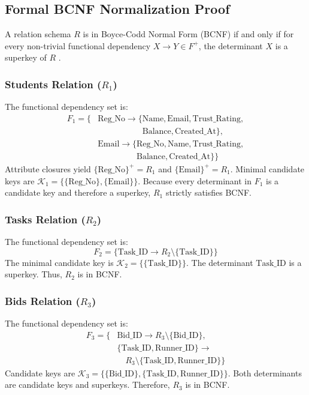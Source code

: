\documentclass[conference]{IEEEtran}
\begin{document}
\subsection{Formal BCNF Normalization Proof}
A relation schema $R$ is in Boyce-Codd Normal Form (BCNF) if and only if for every non-trivial functional dependency $X \to Y \in F^+$, the determinant $X$ is a superkey of $R$ \cite{codd1974further}.

\subsubsection{Students Relation ($R_1$)}
The functional dependency set is:
\begin{align*}
    F_1 = \{ & \text{Reg\_No} \to \{\text{Name}, \text{Email}, \text{Trust\_Rating}, \\
             & \phantom{\text{Reg\_No} \to \{} \text{Balance}, \text{Created\_At}\}, \\
             & \text{Email} \to \{\text{Reg\_No}, \text{Name}, \text{Trust\_Rating}, \\
             & \phantom{\text{Email} \to \{} \text{Balance}, \text{Created\_At}\} \}
\end{align*}
Attribute closures yield $\{\text{Reg\_No}\}^+ = R_1$ and $\{\text{Email}\}^+ = R_1$. Minimal candidate keys are $\mathcal{K}_1 = \{\{\text{Reg\_No}\}, \{\text{Email}\}\}$. Because every determinant in $F_1$ is a candidate key and therefore a superkey, $R_1$ strictly satisfies BCNF.

\subsubsection{Tasks Relation ($R_2$)}
The functional dependency set is:
\begin{equation*}
    F_2 = \{ \text{Task\_ID} \to R_2 \setminus \{\text{Task\_ID}\} \}
\end{equation*}
The minimal candidate key is $\mathcal{K}_2 = \{\{\text{Task\_ID}\}\}$. The determinant $\text{Task\_ID}$ is a superkey. Thus, $R_2$ is in BCNF.

\subsubsection{Bids Relation ($R_3$)}
The functional dependency set is:
\begin{align*}
    F_3 = \{ & \text{Bid\_ID} \to R_3 \setminus \{\text{Bid\_ID}\}, \\
             & \{\text{Task\_ID}, \text{Runner\_ID}\} \to \\
             & \quad R_3 \setminus \{\text{Task\_ID}, \text{Runner\_ID}\} \}
\end{align*}
Candidate keys are $\mathcal{K}_3 = \{\{\text{Bid\_ID}\}, \{\text{Task\_ID}, \text{Runner\_ID}\}\}$. Both determinants are candidate keys and superkeys. Therefore, $R_3$ is in BCNF.
\end{document}
